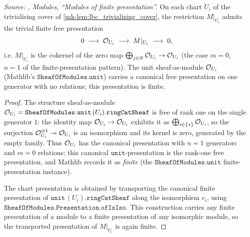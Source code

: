 \begin{lemma}\label{mk-lem:lbc_chart_presentation}
  \leanok

  \textit{Source: \cite{stacks-project}, Modules, ``Modules of finite
  presentation''.}
  On each chart \(U_i\) of the trivialising cover of
  \ref{mk-lem:lbc_trivializing_cover}, the restriction \(M|_{U_i}\) admits the
  trivial finite free presentation
  \[
    0 \;\longrightarrow\; \mathcal{O}_{U_i} \;\longrightarrow\; M|_{U_i}
    \;\longrightarrow\; 0,
  \]
  i.e. \(M|_{U_i}\) is the cokernel of the zero map
  \(\bigoplus_{j \in \varnothing} \mathcal{O}_{U_i} \to \mathcal{O}_{U_i}\)
  (the case \(m = 0\), \(n = 1\) of the finite-presentation pattern). The
  unit sheaf-as-module \(\mathcal{O}_{U_i}\) (Mathlib's \(\mathtt{SheafOfModules.unit}\))
  carries a canonical free presentation on one generator with no relations;
  this presentation is finite.
\end{lemma}

\begin{proof}
  \leanok
  The structure sheaf-as-module \(\mathcal{O}_{U_i} = \mathtt{SheafOfModules.unit}\,
  (U_i).\mathtt{ringCatSheaf}\) is free of rank one on the single generator
  \(1\): the identity map \(\mathcal{O}_{U_i} \to \mathcal{O}_{U_i}\) exhibits it as
  \(\bigoplus_{i \in \{*\}} \mathcal{O}_{U_i}\), so the surjection
  \(\mathcal{O}_{U_i}^{\oplus 1} \twoheadrightarrow \mathcal{O}_{U_i}\) is an isomorphism
  and its kernel is zero, generated by the empty family. Thus \(\mathcal{O}_{U_i}\)
  has the canonical presentation with \(n = 1\) generators and \(m = 0\)
  relations; this canonical \(\mathtt{unit}\)-presentation is the rank-one free
  presentation, and Mathlib records it as \emph{finite} (the
  \(\mathtt{SheafOfModules.unit}\) finite-presentation instance).

  The chart presentation is obtained by transporting the canonical finite
  presentation of \(\mathtt{unit}\,(U_i).\mathtt{ringCatSheaf}\) along the
  isomorphism \(e_i\), using \(\mathtt{SheafOfModules.Presentation.ofIsIso}\).
  This construction carries any finite presentation of a module to a finite
  presentation of any isomorphic module, so the transported presentation of
  \(M|_{U_i}\) is again finite.
\end{proof}

